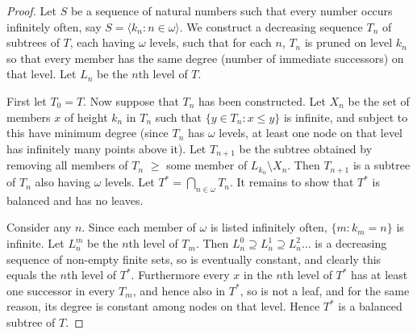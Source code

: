 \documentclass[10pt,a4paper]{amsart}
\begin{document}
\begin{proof} Let $S$ be a sequence of natural numbers such that every number occurs infinitely often, 
say $S = \langle k_n: n \in \omega \rangle$. We construct a decreasing sequence $T_n$ of subtrees 
of $T$, each having $\omega$ levels, such that for each $n$, $T_n$ is pruned on level $k_n$ so that 
every member has the same degree (number of immediate successors) on that level. Let $L_n$ be the 
$n$th level of $T$.

First let $T_0 = T$. Now suppose that $T_n$ has been constructed. Let $X_n$ be the set of
members $x$ of height $k_n$ in $T_n$ such that $\{y \in T_n: x \le y\}$ is infinite, and subject to 
this have minimum degree (since $T_n$ has $\omega$ levels, at least one node on that level has 
infinitely many points above it). Let $T_{n+1}$ be the subtree obtained by removing all members 
of $T_n$ $\ge$ some member of $L_{k_n} \setminus X_n$. Then $T_{n+1}$ is a subtree of $T_n$ also having
$\omega$ levels. Let $T^* = \bigcap_{n \in \omega} T_n$. It remains to show that $T^*$ is balanced 
and has no leaves.

Consider any $n$. Since each member of $\omega$ is listed infinitely often, $\{m: k_m = n\}$ is
infinite. Let $L_n^m$ be the $n$th level of $T_m$. Then $L_n^0 \supseteq L_n^1 \supseteq L_n^2 \ldots$
is a decreasing sequence of non-empty finite sets, so is eventually constant, and clearly this equals the 
$n$th level of $T^*$. Furthermore every $x$ in the $n$th level of $T^*$ has at least one successor in
every $T_m$, and hence also in $T^*$, so is not a leaf, and for the same reason, its degree is 
constant among nodes on that level. Hence $T^*$ is a balanced subtree of $T$.
  \end{proof} 
\end{document}
